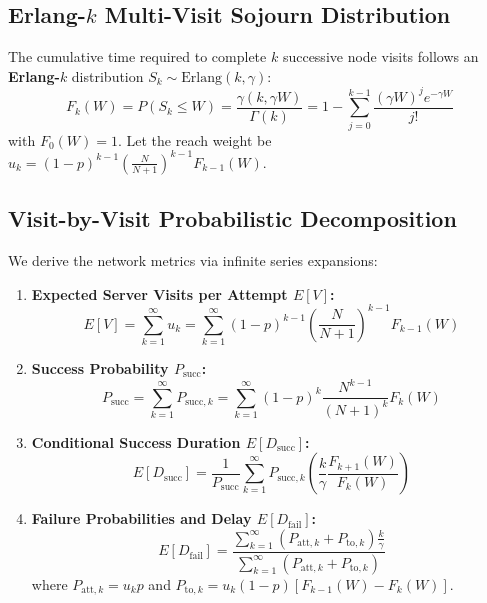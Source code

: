 \documentclass[journal,compsoc]{IEEEtran}
\begin{document}
\subsection{Erlang-$k$ Multi-Visit Sojourn Distribution}
The cumulative time required to complete $k$ successive node visits follows an \textbf{Erlang-$k$} distribution $S_k \sim \text{Erlang}(k, \gamma)$:
\begin{equation}
F_k(W) = P(S_k \le W) = \frac{\gamma(k, \gamma W)}{\Gamma(k)} = 1 - \sum_{j=0}^{k-1} \frac{(\gamma W)^j e^{-\gamma W}}{j!}
\end{equation}
with $F_0(W) = 1$. Let the reach weight be $u_k = (1 - p)^{k-1} \left(\frac{N}{N+1}\right)^{k-1} F_{k-1}(W)$.

\subsection{Visit-by-Visit Probabilistic Decomposition}
We derive the network metrics via infinite series expansions:
\begin{enumerate}
    \item \textbf{Expected Server Visits per Attempt $E[V]$:}
    \begin{equation}
    E[V] = \sum_{k=1}^\infty u_k = \sum_{k=1}^\infty (1 - p)^{k-1} \left(\frac{N}{N+1}\right)^{k-1} F_{k-1}(W)
    \end{equation}
    \item \textbf{Success Probability $P_{\text{succ}}$:}
    \begin{equation}
    P_{\text{succ}} = \sum_{k=1}^\infty P_{\text{succ}, k} = \sum_{k=1}^\infty (1 - p)^k \frac{N^{k-1}}{(N+1)^k} F_k(W)
    \end{equation}
    \item \textbf{Conditional Success Duration $E[D_{\text{succ}}]$:}
    \begin{equation}
    E[D_{\text{succ}}] = \frac{1}{P_{\text{succ}}} \sum_{k=1}^\infty P_{\text{succ}, k} \left(\frac{k}{\gamma} \frac{F_{k+1}(W)}{F_k(W)}\right)
    \end{equation}
    \item \textbf{Failure Probabilities and Delay $E[D_{\text{fail}}]$:}
    \begin{equation}
    E[D_{\text{fail}}] = \frac{\sum_{k=1}^\infty (P_{\text{att}, k} + P_{\text{to}, k}) \frac{k}{\gamma}}{\sum_{k=1}^\infty (P_{\text{att}, k} + P_{\text{to}, k})}
    \end{equation}
    where $P_{\text{att}, k} = u_k p$ and $P_{\text{to}, k} = u_k (1 - p) [F_{k-1}(W) - F_k(W)]$.
\end{enumerate}
\end{document}
